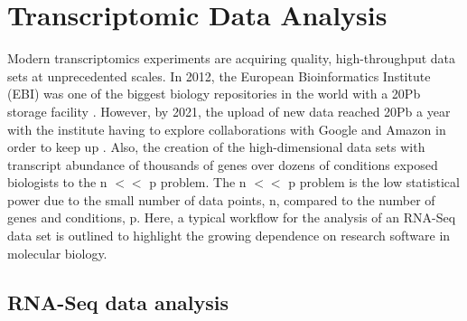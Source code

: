 \documentclass[../main.tex]{subfiles}
\begin{document}
\newpage

\section{Transcriptomic Data Analysis}

Modern transcriptomics experiments are acquiring quality, high-throughput data sets at unprecedented scales. 
In 2012, the European Bioinformatics Institute (EBI) was one of the biggest biology repositories in the world with a 20Pb storage facility \parencite{EBI2012}. 
However, by 2021, the upload of new data reached 20Pb a year with the institute having to explore collaborations with Google and Amazon in order to keep up \parencite{EBI2021}.
Also, the creation of the high-dimensional data sets with transcript abundance of thousands of genes over dozens of conditions exposed biologists to the n $<<$ p problem.
The n $<<$ p problem is the low statistical power due to the small number of data points, n, compared to the number of genes and conditions, p.
Here, a typical workflow for the analysis of an RNA-Seq data set is outlined to highlight the growing dependence on research software in molecular biology.

\subsection{RNA-Seq data analysis}
\end{document}
